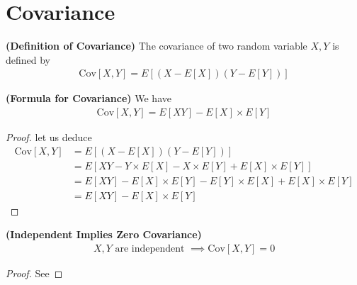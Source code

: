 \documentclass{report}
\begin{document}
\section{Covariance}
\begin{definition}
\label{4.4.1}
\textbf{(Definition of Covariance)} The covariance of two random variable $X,Y$ is defined by 
\begin{align*}
\text{Cov}[X,Y]=E[(X-E[X])(Y-E[Y])]
\end{align*}
\end{definition}
\begin{theorem}
\label{4.4.2}
\textbf{(Formula for Covariance)} We have 
\begin{align*}
\text{Cov}[X,Y]=E[XY]-E[X]\times E[Y]
\end{align*}
\end{theorem}
\begin{proof}
 let us deduce
\begin{align*}
\text{Cov}[X,Y]&=E[(X-E[X])(Y-E[Y])]\\
&=E[XY-Y\times E[X]-X \times E[Y]+E[X]\times E[Y]]\\
&=E[XY]-E[X]\times E[Y]-E[Y]\times E[X]+E[X]\times E[Y]\\
&=E[XY]-E[X]\times E[Y]
\end{align*}
\end{proof}
\begin{theorem}
\label{4.4.3}
\textbf{(Independent Implies Zero Covariance)}
\begin{align*}
X,Y\text{ are independent }\implies \text{Cov}[X,Y]=0
\end{align*}
\end{theorem}
\begin{proof}
See 
\end{proof}
\end{document}
